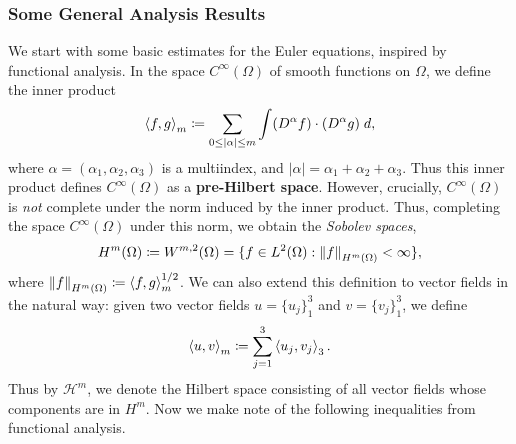 \documentclass{article}
\begin{document}
\subsubsection{Some General Analysis Results}
We start with some basic estimates for the Euler equations, inspired by functional analysis. In the space $C^{\infty}(\Omega)$ of smooth functions on $\Omega$, we define the inner product 
\begin{equation*}
	\braket{f, g}_{m} \coloneqq \sum_{0 \leq |\alpha|\leq m}\int (D^{\alpha}f) \cdot (D^{\alpha}g)\;d, 
\end{equation*}
where $\alpha = (\alpha_{1}, \alpha_{2}, \alpha_{3})$ is a multiindex, and $|\alpha| = \alpha_{1} + \alpha_{2} + \alpha_{3}$. Thus this inner product defines $C^{\infty}(\Omega)$ as a \textbf{pre-Hilbert space}. However, crucially, $C^{\infty}(\Omega)$ is \textit{not} complete under the norm induced by the inner product. Thus, completing the space $C^{\infty}(\Omega)$ under this norm, we obtain the \textit{Sobolev spaces}, 
\begin{equation*}
	H^{m}(\Omega) \coloneqq W^{m,2}(\Omega) = \{f \in L^{2}(\Omega): \left\Vert f \right\Vert_{H^{m}(\Omega)} < \infty\}, 
\end{equation*} 
where $\left\Vert f \right\Vert_{H^{m}(\Omega)} \coloneqq \braket{f, g}_{m}^{1/2}$. We can also extend this definition to vector fields in the natural way: given two vector fields $u = \{u_{j}\}_{1}^{3}$ and $v = \{v_{j}\}_{1}^{3}$, we define 
\begin{equation*}
	\braket{u,v}_{m} \coloneqq \sum_{j = 1}^{3}\braket{u_{j},v_{j}}_{3}. 
\end{equation*}
Thus by $\mathcal{H}^{m}$, we denote the Hilbert space consisting of all vector fields whose components are in $H^{m}$. Now we make note of the following inequalities from functional analysis. 
\end{document}
